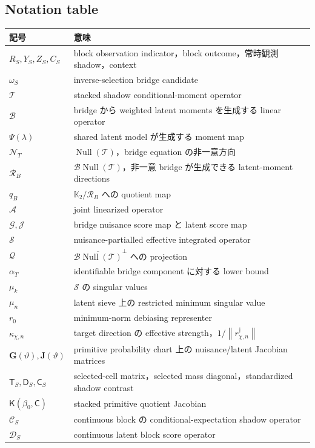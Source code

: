 \documentclass[11pt,a4paper]{ltjsarticle}
\theoremstyle{remark}
\newcommand{\norm}[1]{\left\lVert#1\right\rVert}
\newcommand{\cN}{\mathcal N}
\newcommand{\cR}{\mathcal R}
\newcommand{\Aop}{\mathscr A}
\newcommand{\Top}{\mathscr T}
\newcommand{\Bop}{\mathscr B}
\newcommand{\Gop}{\mathscr G}
\newcommand{\Jop}{\mathscr J}
\newcommand{\Sop}{\mathscr S}
\newcommand{\Cop}{\mathscr C}
\newcommand{\Jcal}{\mathscr D}
\newcommand{\Qop}{\mathscr Q}
\newcommand{\Null}{\operatorname{Null}}
\begin{document}
\subsection{Notation table}
\begin{longtable}{p{34mm}p{112mm}}
\toprule
記号 & 意味\\
\midrule
$R_S,Y_S,Z_S,C_S$ & block observation indicator，block outcome，常時観測 shadow，context\\
$\omega_S$ & inverse-selection bridge candidate\\
$\Top$ & stacked shadow conditional-moment operator\\
$\Bop$ & bridge から weighted latent moments を生成する linear operator\\
$\Psi(\lambda)$ & shared latent model が生成する moment map\\
$\cN_T$ & $\Null(\Top)$，bridge equation の非一意方向\\
$\cR_B$ & $\Bop\Null(\Top)$，非一意 bridge が生成できる latent-moment directions\\
$q_B$ & $\mathbb K_2/\cR_B$ への quotient map\\
$\Aop$ & joint linearized operator\\
$\Gop,\Jop$ & bridge nuisance score map と latent score map\\
$\Sop$ & nuisance-partialled effective integrated operator\\
$\Qop$ & $\overline{\Bop\Null(\Top)}^\perp$ への projection\\
$\alpha_T$ & identifiable bridge component に対する lower bound\\
$\mu_k$ & $\Sop$ の singular values\\
$\mu_n$ & latent sieve 上の restricted minimum singular value\\
$r_0$ & minimum-norm debiasing representer\\
$\kappa_{\chi,n}$ & target direction の effective strength，$1/\norm{r_{\chi,n}^\dagger}$\\
$\mathbf G(\vartheta),\mathbf J(\vartheta)$ & primitive probability chart 上の nuisance/latent Jacobian matrices\\
$\mathsf T_S,\mathsf D_S,\mathsf C_S$ & selected-cell matrix，selected mass diagonal，standardized shadow contrast\\
$\mathsf K(\beta_0,\mathsf C)$ & stacked primitive quotient Jacobian\\
$\Cop_S$ & continuous block の conditional-expectation shadow operator\\
$\Jcal_S$ & continuous latent block score operator\\

\end{longtable}
\end{document}
